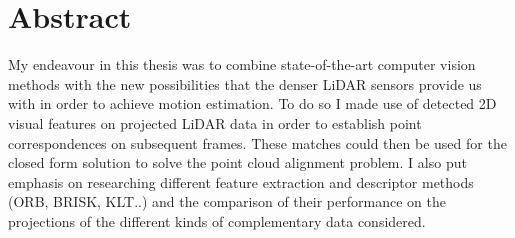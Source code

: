 \chapter*{Abstract}



My endeavour in this thesis was to combine state-of-the-art computer vision methods 
with the new possibilities that the denser LiDAR sensors provide us with in order to achieve motion estimation. To do so I made use of detected 2D visual features on projected LiDAR data in order to establish point correspondences on subsequent frames. These matches could then be used for the closed form solution to solve the point cloud alignment problem.
I also put emphasis on researching different feature extraction and descriptor methods (ORB, BRISK, KLT..) and the comparison of their performance on the projections of the different kinds of complementary data considered.